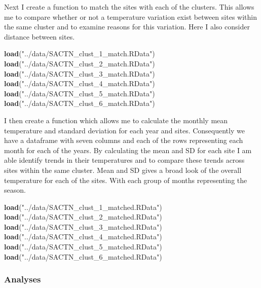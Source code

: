 \documentclass[10pt,a4,]{article}
\newenvironment{Shaded}{\begin{snugshade}}{\end{snugshade}}
\newcommand{\KeywordTok}[1]{\textcolor[rgb]{0.13,0.29,0.53}{\textbf{#1}}}
\newcommand{\NormalTok}[1]{#1}
\newcommand{\StringTok}[1]{\textcolor[rgb]{0.31,0.60,0.02}{#1}}
\begin{document}
Next I create a function to match the sites with each of the clusters.
This allows me to compare whether or not a temperature variation exist
between sites within the same cluster and to examine reasons for this
variation. Here I also consider distance between sites.

\begin{Shaded}
\begin{Highlighting}[]
\KeywordTok{load}\NormalTok{(}\StringTok{"../data/SACTN_clust_1_match.RData"}\NormalTok{)}
\KeywordTok{load}\NormalTok{(}\StringTok{"../data/SACTN_clust_2_match.RData"}\NormalTok{)}
\KeywordTok{load}\NormalTok{(}\StringTok{"../data/SACTN_clust_3_match.RData"}\NormalTok{)}
\KeywordTok{load}\NormalTok{(}\StringTok{"../data/SACTN_clust_4_match.RData"}\NormalTok{)}
\KeywordTok{load}\NormalTok{(}\StringTok{"../data/SACTN_clust_5_match.RData"}\NormalTok{)}
\KeywordTok{load}\NormalTok{(}\StringTok{"../data/SACTN_clust_6_match.RData"}\NormalTok{)}
\end{Highlighting}
\end{Shaded}

I then create a function which allows me to calculate the monthly mean
temperature and standard deviation for each year and sites. Consequently
we have a dataframe with seven columns and each of the rows representing
each month for each of the years. By calculating the mean and SD for
each site I am able identify trends in their temperatures and to compare
these trends across sites within the same cluster. Mean and SD gives a
broad look of the overall temperature for each of the sites. With each
group of months representing the season.

\begin{Shaded}
\begin{Highlighting}[]
\KeywordTok{load}\NormalTok{(}\StringTok{"../data/SACTN_clust_1_matched.RData"}\NormalTok{)}
\KeywordTok{load}\NormalTok{(}\StringTok{"../data/SACTN_clust_2_matched.RData"}\NormalTok{)}
\KeywordTok{load}\NormalTok{(}\StringTok{"../data/SACTN_clust_3_matched.RData"}\NormalTok{)}
\KeywordTok{load}\NormalTok{(}\StringTok{"../data/SACTN_clust_4_matched.RData"}\NormalTok{)}
\KeywordTok{load}\NormalTok{(}\StringTok{"../data/SACTN_clust_5_matched.RData"}\NormalTok{)}
\KeywordTok{load}\NormalTok{(}\StringTok{"../data/SACTN_clust_6_matched.RData"}\NormalTok{)}
\end{Highlighting}
\end{Shaded}

\subsubsection*{Analyses}
\end{document}
